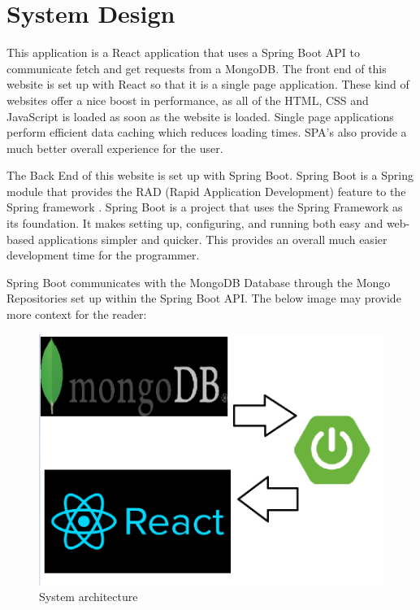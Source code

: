 \chapter{System Design}
This application is a React application that uses a Spring Boot API to communicate fetch and get requests from a MongoDB. The front end of this website is set up with React so that it is a single page application. These kind of websites offer a nice boost in performance, as all of the HTML, CSS and JavaScript is loaded as soon as the website is loaded. Single page applications perform efficient data caching which reduces loading times. SPA's also provide a much better overall experience for the user. \par
The Back End of this website is set up with Spring Boot. Spring Boot is a Spring module that provides the RAD (Rapid Application Development) feature to the Spring framework \cite{Javapoint}. Spring Boot is a project that uses the Spring Framework as its foundation.
It makes setting up, configuring, and running both easy and web-based applications simpler and quicker. This provides an overall much easier development time for the programmer. \par
Spring Boot communicates with the MongoDB Database through the Mongo Repositories set up within the Spring Boot API. The below image may provide more context for the reader:

\begin{figure}[ht]
\renewcommand\thefigure{4.1}
\centering
\includegraphics[scale=0.28]{img/architecture.png}
\caption{System architecture}
\label{SystemArch}
\end{figure}

